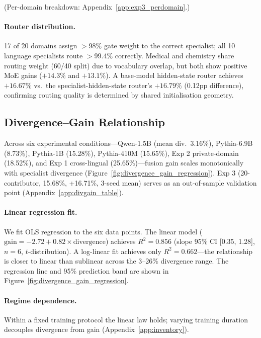\documentclass{article}
\begin{document}
(Per-domain breakdown: Appendix~\ref{app:exp3_perdomain}.)

\paragraph{Router distribution.} 17 of 20 domains assign $>$98\% gate weight to the correct specialist; all 10 language specialists route $>$99.4\% correctly. Medical and chemistry share routing weight (60/40 split) due to vocabulary overlap, but both show positive MoE gains ($+14.3\%$ and $+13.1\%$). A base-model hidden-state router achieves $+16.67\%$ vs.\ the specialist-hidden-state router's $+16.79\%$ (0.12pp difference), confirming routing quality is determined by shared initialisation geometry.

\subsection{Divergence--Gain Relationship}
\label{sec:divergence_gain}

Across six experimental conditions---Qwen-1.5B (mean div.\ 3.16\%), Pythia-6.9B (8.73\%), Pythia-1B (15.28\%), Pythia-410M (15.65\%), Exp 2 private-domain (18.52\%), and Exp 1 cross-lingual (25.65\%)---fusion gain scales monotonically with specialist divergence (Figure~\ref{fig:divergence_gain_regression}). Exp 3 (20-contributor, 15.68\%, +16.71\%, 3-seed mean) serves as an out-of-sample validation point (Appendix~\ref{app:divgain_table}).

\paragraph{Linear regression fit.} We fit OLS regression to the six data points. The linear model ($\text{gain} = -2.72 + 0.82 \times \text{divergence}$) achieves $R^2 = 0.856$ (slope 95\% CI [0.35, 1.28], $n=6$, $t$-distribution). A log-linear fit achieves only $R^2 = 0.662$---the relationship is closer to linear than sublinear across the 3--26\% divergence range. The regression line and 95\% prediction band are shown in Figure~\ref{fig:divergence_gain_regression}.

\paragraph{Regime dependence.} Within a fixed training protocol the linear law holds; varying training duration decouples divergence from gain (Appendix~\ref{app:inventory}).
\end{document}
